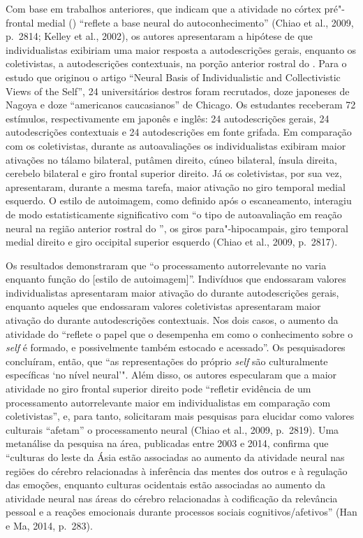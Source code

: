 Com base em trabalhos anteriores, que indicam que a atividade no
córtex pré"-frontal medial () ``reflete a base neural do
autoconhecimento'' (Chiao et al., 2009, p.~2814; Kelley et al., 2002), os
autores apresentaram a hipótese de que individualistas exibiriam uma
maior resposta a autodescrições gerais, enquanto os coletivistas, a
autodescrições contextuais, na porção anterior rostral do . Para o
estudo que originou o artigo ``Neural Basis of Individualistic and
Collectivistic Views of the Self'', 24 universitários
destros foram recrutados, doze japoneses de Nagoya e doze ``americanos
caucasianos'' de Chicago. Os estudantes receberam 72
estímulos, respectivamente em japonês e inglês: 24
autodescrições gerais, 24 autodescrições contextuais e
24 autodescrições em fonte grifada. Em comparação com os
coletivistas, durante as autoavaliações os individualistas exibiram
maior ativações no tálamo bilateral, putâmen direito, cúneo bilateral,
ínsula direita, cerebelo bilateral e giro frontal superior direito. Já
os coletivistas, por sua vez, apresentaram, durante a mesma tarefa,
maior ativação no giro temporal medial esquerdo. O estilo de
autoimagem, como definido após o escaneamento, interagiu de modo
estatisticamente significativo com ``o tipo de autoavaliação em reação
neural na região anterior rostral do '', os giros para"-hipocampais,
giro temporal medial direito e giro occipital superior esquerdo (Chiao
et al., 2009, p.~2817).

Os resultados demonstraram que ``o processamento autorrelevante no 
varia enquanto função do {[}estilo de autoimagem{]}''. Indivíduos que
endossaram valores individualistas apresentaram maior ativação do 
durante autodescrições gerais, enquanto aqueles que endossaram valores
coletivistas apresentaram maior ativação do  durante autodescrições
contextuais. Nos dois casos, o aumento da atividade do  ``reflete o
papel que o  desempenha em como o conhecimento sobre o \emph{self} é
formado, e possivelmente também estocado e acessado''. Os pesquisadores
concluíram, então, que ``as representações do
próprio \emph{self} são culturalmente específicas `no nível neural'". Além
disso, os autores especularam que a maior atividade no giro frontal
superior direito pode ``refletir evidência de um processamento
autorrelevante maior em individualistas em comparação com
coletivistas'', e, para tanto, solicitaram mais pesquisas para elucidar
como valores culturais ``afetam'' o processamento neural (Chiao et al.,
2009, p.~2819). Uma metanálise da pesquisa na área, publicadas entre
2003 e 2014, confirma que ``culturas do leste da Ásia estão associadas
ao aumento da atividade neural nas regiões do cérebro relacionadas à
inferência das mentes dos outros e à regulação das emoções, enquanto
culturas ocidentais estão associadas ao aumento da atividade neural nas
áreas do cérebro relacionadas à codificação da relevância pessoal e a
reações emocionais durante processos sociais cognitivos/afetivos'' (Han
e Ma, 2014, p.~283).

